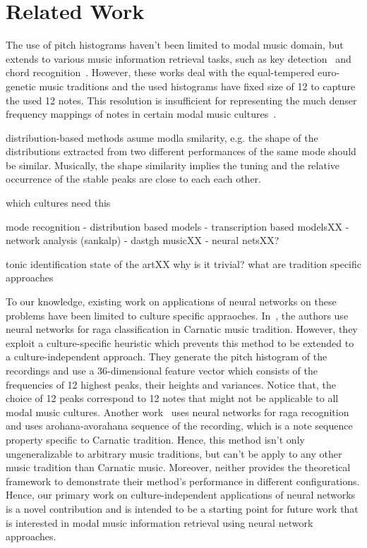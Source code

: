 \documentclass{sig-alternate}
\begin{document}
\section{Related Work}\label{sec:stateoftheart}

The use of pitch histograms haven't been limited to modal music domain, but extends to various music information retrieval tasks, such as key detection~\cite{key_detection} and chord recognition~\cite{emilia}. However, these works deal with the equal-tempered euro-genetic music traditions and the used histograms have fixed size of 12 to capture the used 12 notes. This resolution is insufficient for representing the much denser frequency mappings of notes in certain modal music cultures~\cite{chordia, bozkurt_makam, bozkurt_tonic}. 

distribution-based methods asume modla smilarity, e.g. the shape of the distributions extracted from two different performances of the same mode should be similar. Musically, the shape similarity implies the tuning and the relative occurrence of the stable peaks are close to each each other.

which cultures need this

mode recognition
- distribution based models
- transcription based modelsXX
- network analysis (sankalp)
- dastgh musicXX
- neural netsXX?

tonic identification state of the artXX why is it trivial? what are tradition specific approaches 

To our knowledge, existing work on applications of neural networks on these problems have been limited to culture specific appraoches. In~\cite{neural_raga_chapter}, the authors use neural networks for raga classification in Carnatic music tradition. However, they exploit a culture-specific heuristic which prevents this method to be extended to a culture-indepen\-dent approach. They generate the pitch histogram of the recordings and use a 36-dimensional feature vector which consists of the frequencies of 12 highest peaks, their heights and variances. Notice that, the choice of 12 peaks correspond to 12 notes that might not be applicable to all modal music cultures. Another work~\cite{raga_mining} uses neural networks for raga recognition and uses arohana-avorahana sequence of the recording, which is a note sequence property specific to Carnatic tradition. Hence, this method isn't only ungeneralizable to arbitrary music traditions, but can't be apply to any other music tradition than Carnatic music. Moreover, neither provides the theoretical framework to demonstrate their method's performance in different configurations. Hence, our primary work on culture-independent applications of neural networks is a novel contribution and is intended to be a starting point for future work that is interested in modal music information retrieval using neural network approaches.
\end{document}
